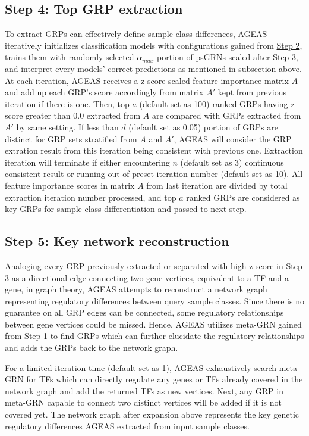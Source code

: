 \documentclass[fleqn,10pt]{wlscirep}
\begin{document}
  \subsection*{Step 4: Top GRP extraction}
    \label{step4}
    To extract GRPs can effectively define sample class differences, AGEAS iteratively initializes classification models with configurations gained from \hyperref[step2]{Step 2}, trains them with randomly selected $\alpha_{max}$ portion of psGRNs scaled after \hyperref[step3]{Step 3}, and interpret every models' correct predictions as mentioned in \hyperref[features_importances]{subsection} above.
    At each iteration, AGEAS receives a z-score scaled feature importance matrix $A$ and add up each GRP's score accordingly from matrix $A'$ kept from previous iteration if there is one.
    Then, top $a$ (default set as 100) ranked GRPs having z-score greater than $0.0$ extracted from $A$ are compared with GRPs extracted from $A'$ by same setting.
    If less than $d$ (default set as 0.05) portion of GRPs are distinct for GRP sets stratified from $A$ and $A'$, AGEAS will consider the GRP extration result from this iteration being consistent with previous one.
    Extraction iteration will terminate if either encountering $n$ (default set as 3) continuous consistent result or running out of preset iteration number (default set as 10).
    All feature importance scores in matrix $A$ from last iteration are divided by total extraction iteration number processed, and top $a$ ranked GRPs are considered as key GRPs for sample class differentiation and passed to next step.

  \subsection*{Step 5: Key network reconstruction}
    \label{step5}
    Analoging every GRP previously extracted or separated with high z-score in \hyperref[step3]{Step 3} as a directional edge connecting two gene vertices, equivalent to a TF and a gene, in graph theory, AGEAS attempts to reconstruct a network graph representing regulatory differences between query sample classes.
    Since there is no guarantee on all GRP edges can be connected, some regulatory relationships between gene vertices could be missed.
    Hence, AGEAS utilizes meta-GRN gained from \hyperref[step1]{Step 1} to find GRPs which can further elucidate the regulatory relationships and adds the GRPs back to the network graph.

    For a limited iteration time (default set as  1), AGEAS exhaustively search meta-GRN for TFs which can directly regulate any genes or TFs already covered in the network graph and add the returned TFs as new vertices.
    Next, any GRP in meta-GRN capable to connect two distinct vertices will be added if it is not covered yet.
    The network graph after expansion above represents the key genetic regulatory differences AGEAS extracted from input sample classes.
\end{document}
